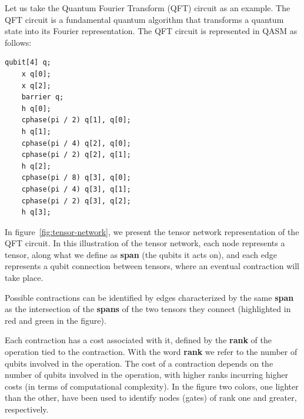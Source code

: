 \documentclass[12pt,oneside,a4paper]{article}
\begin{document}
Let us take the Quantum Fourier Transform (QFT)\cite{coppersmith2002approximatefouriertransformuseful} circuit as an example. The QFT circuit is a fundamental quantum algorithm that transforms a quantum state into its Fourier representation. The QFT circuit is represented in QASM as follows:

\begin{lstlisting}[style=qasm, caption={QFT Circuit in QASM}]
	qubit[4] q;
	x q[0];
	x q[2];
	barrier q;
	h q[0];
	cphase(pi / 2) q[1], q[0];
	h q[1];
	cphase(pi / 4) q[2], q[0];
	cphase(pi / 2) q[2], q[1];
	h q[2];
	cphase(pi / 8) q[3], q[0];
	cphase(pi / 4) q[3], q[1];
	cphase(pi / 2) q[3], q[2];
	h q[3];
\end{lstlisting}


In figure~\ref{fig:tensor-network}, we present the tensor network representation of the QFT circuit. In this illustration of the tensor network, each node represents a tensor, along what we define as \textbf{span} (the qubits it acts on), and each edge represents a qubit connection between tensors, where an eventual contraction will take place.

Possible contractions can be identified by edges characterized by the same \textbf{span} as the intersection of the \textbf{spans} of the two tensors they connect (highlighted in red and green in the figure).

Each contraction has a cost associated with it, defined by the \textbf{rank} of the operation tied to the contraction. With the word \textbf{rank} we refer to the number of qubits involved in the operation. The cost of a contraction depends on the number of qubits involved in the operation, with higher ranks incurring higher costs (in terms of computational complexity). In the figure two colors, one lighter than the other, have been used to identify nodes (gates) of rank one and greater, respectively.
\end{document}
